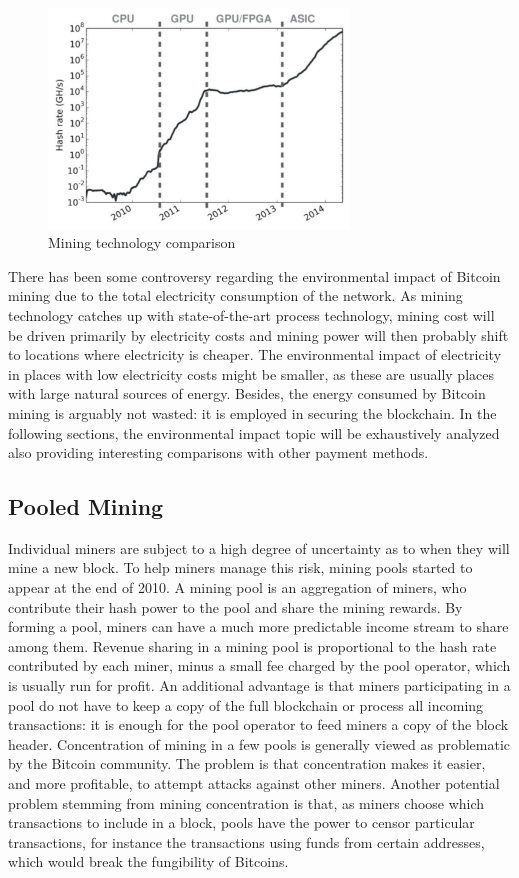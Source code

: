 \documentclass{article}
\begin{document}
\begin{figure}[H]
    \centering
    \includegraphics[width=8cm]{images/14.png}
    \caption{Mining technology comparison}
\end{figure}

\noindent There has been some controversy regarding the environmental impact of Bitcoin mining due to the total electricity consumption of the network. As mining technology catches up with state-of-the-art process technology, mining cost will be driven primarily by electricity costs and mining power will then probably shift to locations where electricity is cheaper. The environmental impact of electricity in places with low electricity costs might be smaller, as these are usually places with large natural sources of energy. Besides, the energy consumed by Bitcoin mining is arguably not wasted: it is employed in securing the blockchain.\newline
In the following sections, the environmental impact topic will be exhaustively analyzed also providing interesting comparisons with other payment methods.

\subsection*{Pooled Mining}
Individual miners are subject to a high degree of uncertainty as to when they will mine a new block. To help miners manage this risk, mining pools started to appear at the end of 2010. A mining pool is an aggregation of miners, who contribute their hash power to the pool and share the mining rewards. By forming a pool, miners can have a much more predictable income stream to share among them. Revenue sharing in a mining pool is proportional to the hash rate contributed by each miner, minus a small fee charged by the pool operator, which is usually run for profit. An additional advantage is that miners participating in a pool do not have to keep a copy of the full blockchain or process all incoming transactions: it is enough for the pool operator to feed miners a copy of the block header.\newline
Concentration of mining in a few pools is generally viewed as problematic by the Bitcoin community. The problem is that concentration makes it easier, and more profitable, to attempt attacks against other miners. Another potential problem stemming from mining concentration is that, as miners choose which transactions to include in a block, pools have the power to censor particular transactions, for instance the transactions using funds from certain addresses, which would break the fungibility of Bitcoins.
\end{document}
